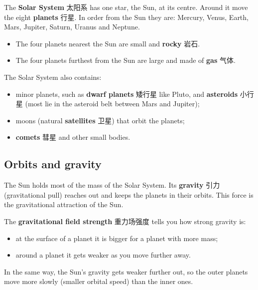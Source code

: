 \documentclass[11pt]{article}
\begin{document}
The \textbf{Solar System} 太阳系 has one star, the Sun, at its centre. Around it move the eight \textbf{planets} 行星. In order from the Sun they are: Mercury, Venus, Earth, Mars, Jupiter, Saturn, Uranus and Neptune.

\begin{itemize}
\item The four planets nearest the Sun are small and \textbf{rocky} 岩石.

\item The four planets furthest from the Sun are large and made of \textbf{gas} 气体.

\end{itemize}

The Solar System also contains:

\begin{itemize}
\item minor planets, such as \textbf{dwarf planets} 矮行星 like Pluto, and \textbf{asteroids} 小行星 (most lie in the asteroid belt between Mars and Jupiter);

\item moons (natural \textbf{satellites} 卫星) that orbit the planets;

\item \textbf{comets} 彗星 and other small bodies.

\end{itemize}

\subsection*{Orbits and gravity}

The Sun holds most of the mass of the Solar System. Its \textbf{gravity} 引力 (gravitational pull) reaches out and keeps the planets in their orbits. This force is the gravitational attraction of the Sun.

The \textbf{gravitational field strength} 重力场强度 tells you how strong gravity is:

\begin{itemize}
\item at the surface of a planet it is bigger for a planet with more mass;

\item around a planet it gets weaker as you move further away.

\end{itemize}

In the same way, the Sun's gravity gets weaker further out, so the outer planets move more slowly (smaller orbital speed) than the inner ones.
\end{document}
